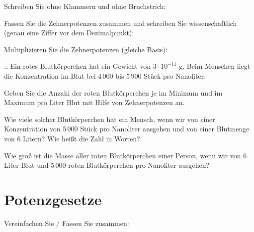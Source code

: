 Schreiben Sie ohne Klammern und ohne Bruchstrich:

Fassen Sie die Zehnerpotenzen zusammen und schreiben Sie
wissenschaftlich (genau eine Ziffer vor dem Dezimalpunkt):




Multiplizieren Sie die Zehnerpotenzen (gleiche Basis):

.:
Ein rotes Blutkörperchen hat ein Gewicht von $3\cdot{}10^{-11}$ g.
Beim Menschen liegt die Konzentration im Blut bei $4\,000$ bis $5\,900$ Stück pro Nanoliter.

\begin{bbwAufgabenBlock}
\item Geben Sie die Anzahl der roten Blutkörperchen je im Minimum und
im Maximum pro Liter Blut mit Hilfe von Zehnerpotenzen
an.

\item Wie viele solcher Blutkörperchen hat ein Mensch, wenn wir von
einer Konzentration von 5\,000 Stück pro Nanoliter ausgehen und von
einer Blutmenge von 6 Litern? Wie heißt die Zahl in Worten?

\item Wie groß ist die Masse aller roten Blutkörperchen einer Person,
wenn wir von 6 Liter Blut und 5\,000 roten Blutkörperchen pro
Nanoliter ausgehen?
\end{bbwAufgabenBlock}


\section{Potenzgesetze}
Vereinfachen Sie / Fassen Sie zusammen:




